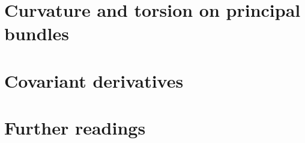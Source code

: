 \documentclass[a4paper,11pt]{article}
\theoremstyle{definition}
\theoremstyle{plain}
\theoremstyle{remark}
\begin{document}
\section{Curvature and torsion on principal bundles}

\newpage

\section{Covariant derivatives}

\newpage

\setcounter{section}{25}

% 

% 

% 

\section*{Further readings}


\printindex
\end{document}
